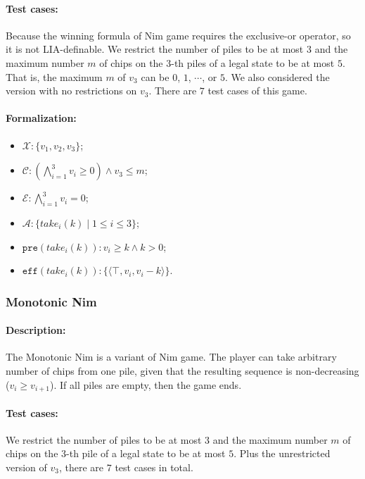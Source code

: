 \documentclass[review]{elsarticle}
\newcommand{\set}[1]{\{ #1 \}}
\newcommand{\tuple}[1]{\langle {#1} \rangle}
\newcommand{\true}{\top}
\newcommand{\statevar}{\mathcal{X}}
\newcommand{\act}{\mathcal{A}}
\newcommand{\constraint}{\mathcal{C}}
\newcommand{\estate}{\mathcal{E}}
\newcommand{\pre}{\mathtt{pre}}
\newcommand{\eff}{\mathtt{eff}}
\begin{document}
\paragraph{Test cases:}
Because the winning formula of Nim game requires the exclusive-or operator, so it is not LIA-definable.
We restrict the number of piles to be at most $3$ and the maximum number $m$ of chips on the $3$-th piles of a legal state to be at most $5$. 
That is, the maximum $m$ of $v_3$ can be $0$, $1$, $\cdots$, or $5$.
We also considered the version with no restrictions on $v_3$.
There are $7$ test cases of this game.

\paragraph{Formalization:}

\begin{itemize}
	\item $\statevar: \set{v_1, v_2, v_3}$;
	\item $\constraint: (\bigwedge_{i=1}^{3} v_i \ge 0) \wedge v_3 \le m$;
	\item $\estate: \bigwedge_{i=1}^{3} v_i = 0$;
	\item $\act : \set{take_i(k) {\mid}1 \leq i \leq 3}$;
	\item $\pre(take_i(k)) : v_i \ge k \wedge k > 0$;
	\item $\eff(take_i(k)) : \set{\tuple{\true,v_i,v_i -k}}$.
\end{itemize}





\subsubsection{Monotonic Nim \protect\cite{AhnCCEFGGKMPS2017} }
\paragraph{Description:} 
The Monotonic Nim is a variant of Nim game.
The player can take arbitrary number of chips from one pile, given that the resulting sequence is non-decreasing ($ v_{i} \ge v_{i+1}$). 
If all piles are empty, then the game ends.

\paragraph{Test cases:}
We restrict the number of piles to be at most $3$ and the maximum number $m$ of chips on the $3$-th pile of a legal state to be at most $5$. 
Plus the unrestricted version of $v_3$, there are $7$ test cases in total.
\end{document}
